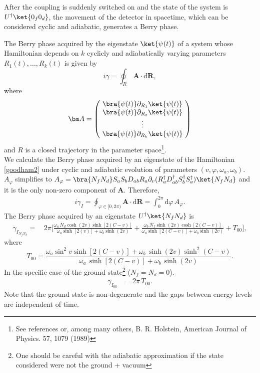 After the coupling is suddenly switched on and the state of the system is  $U^\dagger\ket{0_f0_d}$, the movement of the detector in spacetime, which can be considered cyclic and adiabatic, generates a Berry phase. 

The Berry phase acquired by the eigenstate $\ket{\psi(t)}$  of a system whose Hamiltonian depends on $k$ cyclicly and adiabatically varying parameters $R_1(t),\dots,R_k(t)$ is given by
\begin{equation}\label{Berry}
i\gamma=\oint_R\, \bm A \cdot  \text{d}\bm R,
\end{equation}
where
\begin{equation}\bm A=\left(\!\begin{array}{c}
\bra{\psi(t)}\partial_{R_1}\ket{\psi(t)}\\
\bra{\psi(t)}\partial_{R_2}\ket{\psi(t)}\\
 \vdots\\
 \bra{\psi(t)}\partial_{R_k}\ket{\psi(t)}
\end{array}\!\right)\end{equation}
and $R$ is a closed trajectory in the parameter space\footnote{See references \cite{Berryoriginal,aharonov} or, among many others, B. R. Holstein, American Journal of Physics. 57, 1079 (1989)}.\\

We calculate the Berry phase acquired by an eigenstate of the Hamiltonian \eqref{goodham2} under cyclic and adiabatic evolution of parameters  $(v,\varphi,\omega_a,\omega_b)$. $A_\varphi$ simplifies to $A_\varphi= \bra{N_f N_d}S_aS_bD_{ab}R_a\partial_{v} ( R_a^\dagger D^\dagger_{ab} S_b^\dagger S_a^\dagger)\ket{N_f N_d}$ and it is the only non-zero component of $\bm A$. Therefore,\begin{align}i\gamma_I= \oint_{\varphi\in[0,2\pi)}\!\!\!\!\!\!\!\!\!\!\!\!\!\!\! \bm A \cdot  \text{d}\bm R=\int_{0}^{2\pi}\text{d}\varphi\, A_{\varphi}.\end{align}
The Berry phase acquired by an eigenstate $U^\dagger\ket{N_f N_d}$ is
\begin{align}
 \gamma_{I_{N_fN_d}}\!=&\,2\pi\bigg[\frac{\omega_a\, N_d \cosh(2v)\sinh[2(C-v)]}{\omega_a\sinh[2(v)]+\omega_b\sinh(2v)}+\frac{\omega_b\, N_f \sinh(2v)\cosh[2(C-v)]}{\omega_a\sinh[2(C-v)]+\omega_b\sinh(2v)}+T_{00}\bigg],
\end{align}
where 
\begin{equation}
T_{00}=\frac{\omega_a \sin^2 v \sinh [2(C-v)]+\omega_b\,\sinh(2v)\sinh^2 (C-v)}{\omega_a\, \sinh[2(C-v)]+\omega_b\,\sinh (2v)}.
\end{equation}
In the specific case of the ground state\footnote{One should be careful with the adiabatic approximation if the state considered were not the ground + vacuum} ($N_f=N_d=0$).
\begin{align}
\gamma_{I_{00}}&=2\pi\,T_{00}.
\end{align}
Note that the ground state is non-degenerate and the gaps between energy levels are independent of time. 


